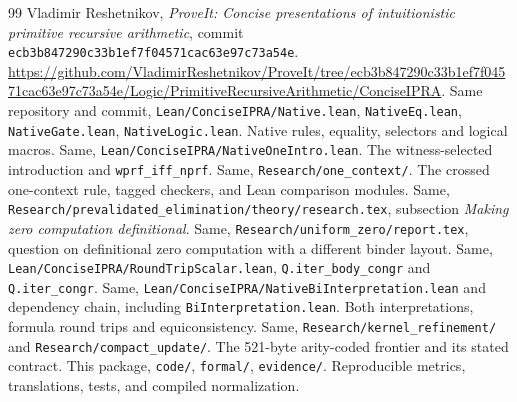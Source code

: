 \documentclass[11pt]{article}
\newcommand{\code}[1]{\nolinkurl{#1}}
\begin{document}
\begin{thebibliography}{99}\footnotesize
\setlength{\itemsep}{1pt}\setlength{\parskip}{0pt}\setlength{\parsep}{0pt}
Vladimir Reshetnikov, \emph{ProveIt: Concise presentations of intuitionistic
primitive recursive arithmetic}, commit
\code{ecb3b847290c33b1ef7f04571cac63e97c73a54e}.
\url{https://github.com/VladimirReshetnikov/ProveIt/tree/ecb3b847290c33b1ef7f04571cac63e97c73a54e/Logic/PrimitiveRecursiveArithmetic/ConciseIPRA}.
Same repository and commit, \code{Lean/ConciseIPRA/Native.lean},
\code{NativeEq.lean}, \code{NativeGate.lean}, \code{NativeLogic.lean}.
Native rules, equality, selectors and logical macros.
Same, \code{Lean/ConciseIPRA/NativeOneIntro.lean}.
The witness-selected introduction and \code{wprf_iff_nprf}.
Same, \code{Research/one_context/}.
The crossed one-context rule, tagged checkers, and Lean comparison modules.
Same, \code{Research/prevalidated_elimination/theory/research.tex},
subsection \emph{Making zero computation definitional}.
Same, \code{Research/uniform_zero/report.tex},
question on definitional zero computation with a different binder layout.
Same, \code{Lean/ConciseIPRA/RoundTripScalar.lean},
\code{Q.iter_body_congr} and \code{Q.iter_congr}.
Same, \code{Lean/ConciseIPRA/NativeBiInterpretation.lean} and dependency
chain, including \code{BiInterpretation.lean}.
Both interpretations, formula round trips and equiconsistency.
Same, \code{Research/kernel_refinement/} and \code{Research/compact_update/}.
The 521-byte arity-coded frontier and its stated contract.
This package, \code{code/}, \code{formal/}, \code{evidence/}.
Reproducible metrics, translations, tests, and compiled normalization.
\end{thebibliography}
\end{document}
